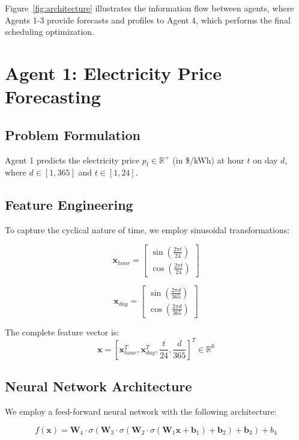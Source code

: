 \documentclass[conference]{IEEEtran}
\begin{document}
Figure~\ref{fig:architecture} illustrates the information flow between agents, where Agents 1-3 provide forecasts and profiles to Agent 4, which performs the final scheduling optimization.

\section{Agent 1: Electricity Price Forecasting}

\subsection{Problem Formulation}
Agent 1 predicts the electricity price $p_t \in \mathbb{R}^+$ (in \$/kWh) at hour $t$ on day $d$, where $d \in [1, 365]$ and $t \in [1, 24]$.

\subsection{Feature Engineering}
To capture the cyclical nature of time, we employ sinusoidal transformations:

\begin{equation}
\mathbf{x}_{hour} = \begin{bmatrix}
\sin\left(\frac{2\pi t}{24}\right) \\
\cos\left(\frac{2\pi t}{24}\right)
\end{bmatrix}
\end{equation}

\begin{equation}
\mathbf{x}_{day} = \begin{bmatrix}
\sin\left(\frac{2\pi d}{365}\right) \\
\cos\left(\frac{2\pi d}{365}\right)
\end{bmatrix}
\end{equation}

The complete feature vector is:
\begin{equation}
\mathbf{x} = \left[\mathbf{x}_{hour}^T, \mathbf{x}_{day}^T, \frac{t}{24}, \frac{d}{365}\right]^T \in \mathbb{R}^6
\end{equation}

\subsection{Neural Network Architecture}
We employ a feed-forward neural network with the following architecture:

\begin{equation}
f(\mathbf{x}) = \mathbf{W}_4 \cdot \sigma(\mathbf{W}_3 \cdot \sigma(\mathbf{W}_2 \cdot \sigma(\mathbf{W}_1 \mathbf{x} + \mathbf{b}_1) + \mathbf{b}_2) + \mathbf{b}_3) + b_4
\end{equation}
\end{document}
